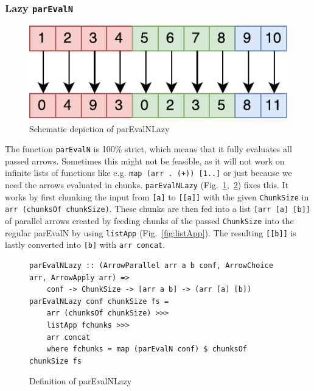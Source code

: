 \documentclass{jfp1}
\newcommand{\inlinecode}[1]{\texttt{#1}}
\begin{document}
\subsubsection{Lazy \inlinecode{parEvalN}}
\begin{figure}[h]
	\includegraphics[scale=0.7]{images/parEvalNLazy}
	\caption{Schematic depiction of parEvalNLazy}
	\label{fig:parEvalNLazyImg}
\end{figure}
The function \inlinecode{parEvalN} is 100\% strict, which means that it fully evaluates all passed arrows. Sometimes this might not be feasible, as it will not work on infinite lists of functions like e.g. \inlinecode{map (arr . (+)) [1..]} or just because we need the arrows evaluated in chunks. \inlinecode{parEvalNLazy} (Fig.~\ref{fig:parEvalNLazyImg},~\ref{fig:parEvalNLazy}) fixes this. It works by first chunking the input from \inlinecode{[a]} to \inlinecode{[[a]]} with the given \inlinecode{ChunkSize} in \inlinecode{arr (chunksOf chunkSize)}. These chunks are then fed into a list \inlinecode{[arr [a] [b]]} of parallel arrows created by feeding chunks of the passed \inlinecode{ChunkSize} into the regular parEvalN by using \inlinecode{listApp} (Fig.~\ref{fig:listApp}). The resulting \inlinecode{[[b]]} is lastly converted into \inlinecode{[b]} with \inlinecode{arr concat}.
\begin{figure}[h]
\begin{lstlisting}[frame=htrbl]
parEvalNLazy :: (ArrowParallel arr a b conf, ArrowChoice arr, ArrowApply arr) =>
	conf -> ChunkSize -> [arr a b] -> (arr [a] [b])
parEvalNLazy conf chunkSize fs =
	arr (chunksOf chunkSize) >>>
	listApp fchunks >>>
	arr concat
	where fchunks = map (parEvalN conf) $ chunksOf chunkSize fs
\end{lstlisting} %
\caption{Definition of parEvalNLazy}
\label{fig:parEvalNLazy}
\end{figure}
\end{document}
